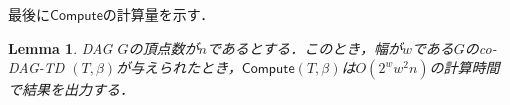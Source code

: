 \documentclass[master]{kuisthesis}		%
\theoremstyle{plain}
\newtheorem{lemma}{Lemma}
\theoremstyle{definition}
\begin{document}

最後に$\mathsf{Compute}$の計算量を示す．

\begin{lemma}
    DAG $G$の頂点数が$n$であるとする．このとき，幅が$w$である$G$のco-DAG-TD $(T, \beta)$が与えられたとき，$\mathsf{Compute}(T, \beta)$は$O(2^ww^2n)$の計算時間で結果を出力する．
\end{lemma}
\end{document}
